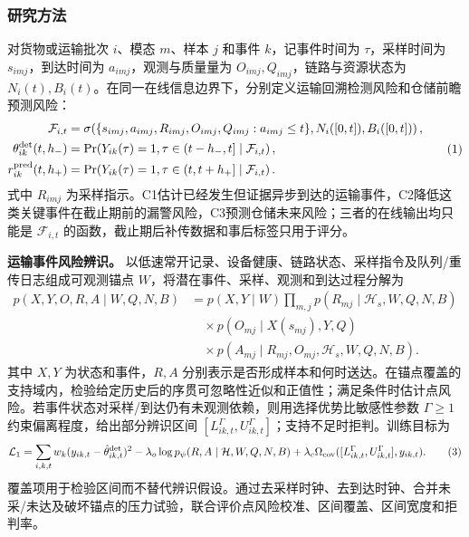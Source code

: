 \justifying
\NSFCBodyText

\subsubsection{研究方法}

对货物或运输批次 \(i\)、模态 \(m\)、样本 \(j\) 和事件 \(k\)，记事件时间为 \(\tau\)，采样时间为 \(s_{imj}\)，到达时间为 \(a_{imj}\)，观测与质量量为 \(O_{imj},Q_{imj}\)，链路与资源状态为 \(N_i(t),B_i(t)\)。在同一在线信息边界下，分别定义运输回溯检测风险和仓储前瞻预测风险：
\[
\begin{aligned}
\mathcal F_{i,t}&=\sigma\!\left(\{s_{imj},a_{imj},R_{imj},O_{imj},Q_{imj}:a_{imj}\le t\},N_i([0,t]),B_i([0,t])\right),\\
\theta^{\rm det}_{ik}(t,h_-)&=\Pr\!\left(Y_{ik}(\tau)=1,\tau\in(t-h_-,t]\mid\mathcal F_{i,t}\right),\\
r^{\rm pred}_{ik}(t,h_+)&=\Pr\!\left(Y_{ik}(\tau)=1,\tau\in(t,t+h_+]\mid\mathcal F_{i,t}\right).
\end{aligned}
\tag{1}
\]
式中 \(R_{imj}\) 为采样指示。C1估计已经发生但证据异步到达的运输事件，C2降低这类关键事件在截止期前的漏警风险，C3预测仓储未来风险；三者的在线输出均只能是 \(\mathcal F_{i,t}\) 的函数，截止期后补传数据和事后标签只用于评分。

\textbf{运输事件风险辨识。} 以低速常开记录、设备健康、链路状态、采样指令及队列/重传日志组成可观测锚点 \(W\)，将潜在事件、采样、观测和到达过程分解为
\[
\begin{aligned}
p(X,Y,O,R,A\mid W,Q,N,B)
&=p(X,Y\mid W)\prod_{m,j}p(R_{mj}\mid\mathcal H_s,W,Q,N,B)\\
&\quad\times p(O_{mj}\mid X(s_{mj}),Y,Q)\\
&\quad\times p(A_{mj}\mid R_{mj},O_{mj},\mathcal H_s,W,Q,N,B).
\end{aligned}
\tag{2}
\]
其中 \(X,Y\) 为状态和事件，\(R,A\) 分别表示是否形成样本和何时送达。在锚点覆盖的支持域内，检验给定历史后的序贯可忽略性近似和正值性；满足条件时估计点风险。若事件状态对采样/到达仍有未观测依赖，则用选择优势比敏感性参数 \(\Gamma\ge1\) 约束偏离程度，给出部分辨识区间 \([L^\Gamma_{ik,t},U^\Gamma_{ik,t}]\)；支持不足时拒判。训练目标为
\[
\mathcal L_1=\sum_{i,k,t}w_k(y_{ik,t}-\hat\theta^{\rm det}_{ik,t})^2-\lambda_o\log p_\psi(R,A\mid\mathcal H,W,Q,N,B)
+\lambda_c\Omega_{\rm cov}([L^\Gamma_{ik,t},U^\Gamma_{ik,t}],y_{ik,t}).
\tag{3}
\]
覆盖项用于检验区间而不替代辨识假设。通过去采样时钟、去到达时钟、合并未采/未达及破坏锚点的压力试验，联合评价点风险校准、区间覆盖、区间宽度和拒判率。

